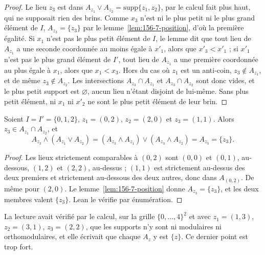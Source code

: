 \begin{proof}
Le lieu $z_3$ est dans $A_{z_1} \vee A_{z_2} = \mathrm{supp}\{z_1, z_2\}$, par le calcul fait plus haut, qui ne supposait rien des brins. Comme $x_3$ n'est ni le plus petit ni le plus grand élément de $I$, $A_{z_3} = \{z_3\}$ par le lemme~\ref{lem:156-7-position}, d'où la première égalité. Si $x_1$ n'est pas le plus petit élément de $I$, le lemme dit que tout lieu de $A_{z_1}$ a une seconde coordonnée au moins égale à $x'_1$, alors que $x'_3 < x'_1$ ; si $x'_1$ n'est pas le plus grand élément de $I'$, tout lieu de $A_{z_1}$ a une première coordonnée au plus égale à $x_1$, alors que $x_1 < x_3$. Hors du cas où $z_1$ est un anti-coin, $z_3 \notin A_{z_1}$, et de même $z_3 \notin A_{z_2}$. Les intersections $A_{z_3} \cap A_{z_1}$ et $A_{z_3} \cap A_{z_2}$ sont donc vides, et le plus petit support est $\varnothing$, aucun lieu n'étant disjoint de lui-même. Sans plus petit élément, ni $x_1$ ni $x'_2$ ne sont le plus petit élément de leur brin.
\end{proof}

\begin{encadre}
\begin{contrexemple}\label{ce:156-7-coin}
Soient $I = I' = \{0, 1, 2\}$, $z_1 = (0, 2)$, $z_2 = (2, 0)$ et $z_3 = (1, 1)$. Alors $z_3 \in A_{z_1} \cap A_{z_2}$, et
\[
A_{z_3} \wedge (A_{z_1} \vee A_{z_2}) = (A_{z_3} \wedge A_{z_1}) \vee (A_{z_3} \wedge A_{z_2}) = A_{z_3} = \{z_3\} .
\]
\end{contrexemple}
\end{encadre}

\begin{proof}
Les lieux strictement comparables à $(0, 2)$ sont $(0, 0)$ et $(0, 1)$, au-dessous, $(1, 2)$ et $(2, 2)$, au-dessus ; $(1, 1)$ est strictement au-dessus des deux premiers et strictement au-dessous des deux autres, donc dans $A_{(0, 2)}$. De même pour $(2, 0)$. Le lemme~\ref{lem:156-7-position} donne $A_{z_3} = \{z_3\}$, et les deux membres valent $\{z_3\}$. Lean le vérifie par énumération.
\end{proof}

La lecture avait vérifié par le calcul, sur la grille $\{0, \ldots, 4\}^2$ et avec $z_1 = (1, 3)$, $z_2 = (3, 1)$, $z_3 = (2, 2)$, que les supports n'y sont ni modulaires ni orthomodulaires, et elle écrivait que chaque $A_z$ y est $\{z\}$. Ce dernier point est trop fort.

